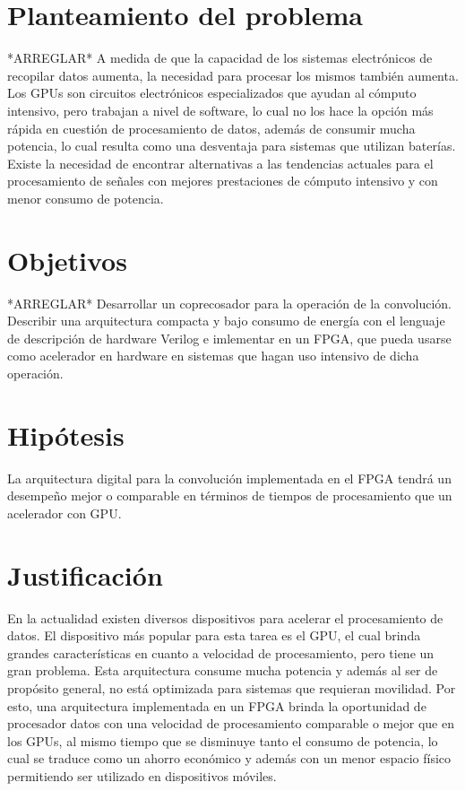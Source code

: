\section{Planteamiento del problema}
*ARREGLAR* 
A medida de que la capacidad de los sistemas electrónicos de recopilar datos aumenta, la necesidad para procesar los mismos también aumenta. Los GPUs son circuitos electrónicos especializados que ayudan al cómputo intensivo, pero trabajan a nivel de software, lo cual no los hace la opción más rápida en cuestión de procesamiento de datos, además de consumir mucha potencia, lo cual resulta como una desventaja para sistemas que utilizan baterías. Existe la necesidad de encontrar alternativas a las tendencias actuales para el procesamiento de señales con mejores prestaciones de cómputo intensivo y con menor consumo de potencia.\\

\section{Objetivos}
*ARREGLAR* 
Desarrollar un coprecosador para la operación de la convolución. Describir una arquitectura compacta y bajo consumo de energía con el lenguaje de descripción de hardware Verilog e imlementar en un FPGA, que pueda usarse como acelerador en hardware en sistemas que hagan uso intensivo de dicha operación.\\

\section{Hipótesis}
La arquitectura digital para la convolución implementada en el FPGA tendrá un desempeño mejor o comparable en términos de tiempos de procesamiento que un acelerador con GPU. \\


\section{Justificación}
En la actualidad existen diversos dispositivos para acelerar el procesamiento de datos. El dispositivo más popular para esta tarea es el GPU, el cual brinda grandes características en cuanto a velocidad de procesamiento, pero tiene un gran problema. Esta arquitectura consume mucha potencia y además al ser de propósito general, no está optimizada para sistemas que requieran movilidad. Por esto, una arquitectura implementada en un FPGA brinda la oportunidad de procesador datos con una velocidad de procesamiento comparable o mejor que en los GPUs, al mismo tiempo que se disminuye tanto el consumo de potencia, lo cual se traduce como un ahorro económico y además con un menor espacio físico permitiendo ser utilizado en dispositivos móviles.\\

